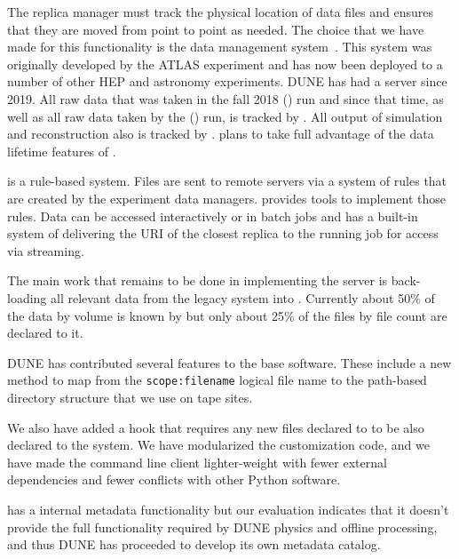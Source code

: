 \documentclass[../main-v1.tex]{subfiles}
\begin{document}
The replica manager must track the physical location of  data files %
and ensures that they 
are moved from point to point as needed. The choice  that we have made 
for this functionality is the  data
management system~\cite{Baritsis:2019csbs}.  This system was originally developed by the ATLAS experiment and has now been deployed to 
a number of other HEP and astronomy experiments.  DUNE has had a  server since 2019.  All raw data that was
taken in the fall 2018  () run and since that time, as well as all raw data taken by the  () run, is tracked by .  All output of  simulation and reconstruction also is tracked by .  plans to take full advantage of the data lifetime features of .

 is a rule-based system.  Files are sent to remote servers via a system of rules
that are created by the experiment data managers.  provides tools to implement those rules.   Data can be accessed interactively or in batch jobs and
 has a built-in system of delivering the URI of the closest replica to the running job for access via streaming.

The main work that remains to be done in implementing the  server is  back-loading all relevant 
data from the legacy  system into .  Currently about 50\% of the data by volume is known by  but only about 25\% of the files by file count are declared to it. 

DUNE has contributed several features to the  base software.  These include a new method to map from the \texttt{scope:filename} logical file name to the path-based directory structure that we use on tape sites.  

We also have added a hook that requires any new files declared to  to be also declared to the  system.  We have modularized the  customization code, and we have made the command line client lighter-weight with fewer external dependencies and fewer conflicts with other Python software. 

 has a internal metadata functionality but our evaluation indicates that it doesn't provide the full functionality required by DUNE physics and offline processing,%
and thus DUNE has proceeded to develop its own metadata catalog. 
\end{document}
